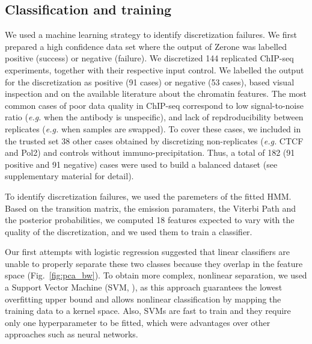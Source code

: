 \documentclass{bioinfo}
\begin{document}
\begin{methods}
\subsection{Classification and training}
\label{sub:training}
We used a machine learning strategy to identify discretization
failures. We first prepared a high confidence data set where the
output of Zerone was labelled positive (success) or negative (failure).
We discretized 144 replicated ChIP-seq experiments, together with their
respective input control.
We labelled the output for the discretization as positive (91 cases)
or negative (53 cases), based visual inspection and on the available
literature about the chromatin features. The most common cases of
poor data quality in ChIP-seq correspond to low signal-to-noise ratio
(\textit{e.g.} when the antibody is unspecific), and lack of
repdroducibility between replicates (\textit{e.g.} when samples are
swapped). To cover these cases, we included in the trusted set
38 other cases obtained by discretizing non-replicates
(\textit{e.g.} CTCF and Pol2) and controls without immuno-precipitation.
Thus, a total of 182 (91 positive and 91 negative) cases were used to build
a balanced dataset (see supplementary material for detail).

To identify discretization failures, we used the paremeters of the
fitted HMM. Based on the transition matrix, the emission paramaters,
the Viterbi Path and the posterior probabilities,
we computed 18 features expected to vary with the quality
of the discretization, and we used them to train a classifier.

Our first attempts with logistic regression suggested that linear
classifiers are unable to properly separate these two classes because
they overlap in the feature space (Fig.~\ref{fig:pca_bw}). To obtain more
complex, nonlinear separation, we used a Support Vector Machine
(SVM, \citealp{Chang2011,e1071}), as this approach guarantees the lowest
overfitting upper bound and allows nonlinear classification by mapping
the training data to a kernel space. Also, SVMs are fast to train and
they require only one hyperparameter to be fitted, which were
advantages over other approaches such as neural networks.


\end{methods}
\end{document}
